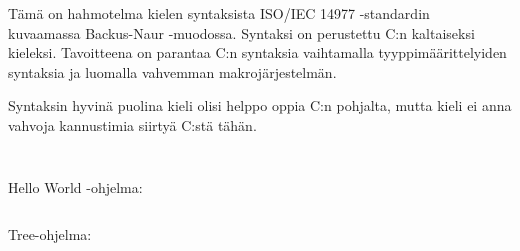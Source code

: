 
Tämä on hahmotelma kielen syntaksista ISO/IEC 14977
-standardin~\citep{iso14977} kuvaamassa Backus-Naur -muodossa. Syntaksi on
perustettu C:n kaltaiseksi kieleksi. Tavoitteena on parantaa C:n syntaksia
vaihtamalla tyyppimäärittelyiden syntaksia ja luomalla vahvemman
makrojärjestelmän.

Syntaksin hyvinä puolina kieli olisi helppo oppia C:n pohjalta, mutta kieli ei anna
vahvoja kannustimia siirtyä C:stä tähän.

\inputminted{abnf}{curly.bnf}

\newpage

\inputminted{abnf}{curly-statement.bnf}

\newpage

Hello World -ohjelma:

\inputminted{C}{hello.curly}

Tree-ohjelma:

\inputminted{C}{tree.curly}
